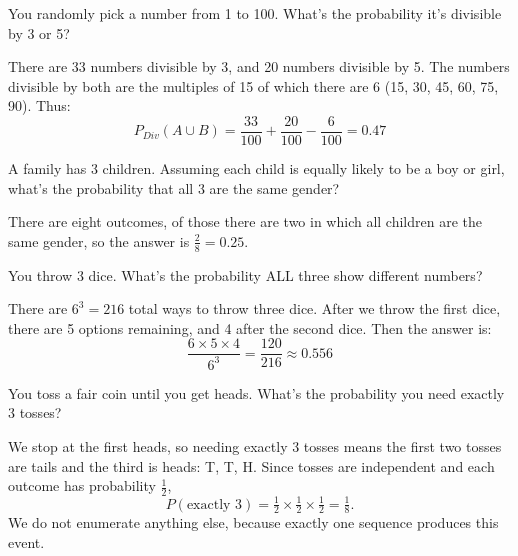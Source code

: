 \begin{problem}
You randomly pick a number from 1 to 100. What's the probability it's divisible by 3 or 5?
\end{problem}

\begin{solution}
There are 33 numbers divisible by 3, and 20 numbers divisible by 5. The numbers divisible by both are the multiples of 15 of which there are 6 (15, 30, 45, 60, 75, 90). Thus:
\[
P_{Div}(A \cup B) = \frac{33}{100} + \frac{20}{100} - \frac{6}{100} = 0.47
\]
\end{solution}

\begin{problem}
A family has 3 children. Assuming each child is equally likely to be a boy or girl, what's the probability that all 3 are the same gender?
\end{problem}

\begin{solution}
There are eight outcomes, of those there are two in which all children are the same gender, so the answer is $\frac{2}{8} = 0.25$.
\end{solution}


\begin{problem}
You throw 3 dice. What's the probability ALL three show different numbers?
\end{problem}

\begin{solution}
There are $6^3 = 216$ total ways to throw three dice. After we throw the first dice, there are 5 options remaining, and 4 after the second dice. Then the answer is:
\[
\frac{6 \times 5 \times 4}{6^3} = \frac{120}{216} \approx 0.556
\]
\end{solution}

\begin{problem}
You toss a fair coin until you get heads. What's the probability you need exactly 3 tosses?
\end{problem}

\begin{solution}
We stop at the first heads, so needing exactly 3 tosses means the first two tosses are tails and the third is heads: T, T, H. Since tosses are independent and each outcome has probability $\frac{1}{2}$,
\[
P(\text{exactly 3}) = \tfrac{1}{2} \times \tfrac{1}{2} \times \tfrac{1}{2} = \tfrac{1}{8}.
\]
We do not enumerate anything else, because exactly one sequence produces this event.
\end{solution}


